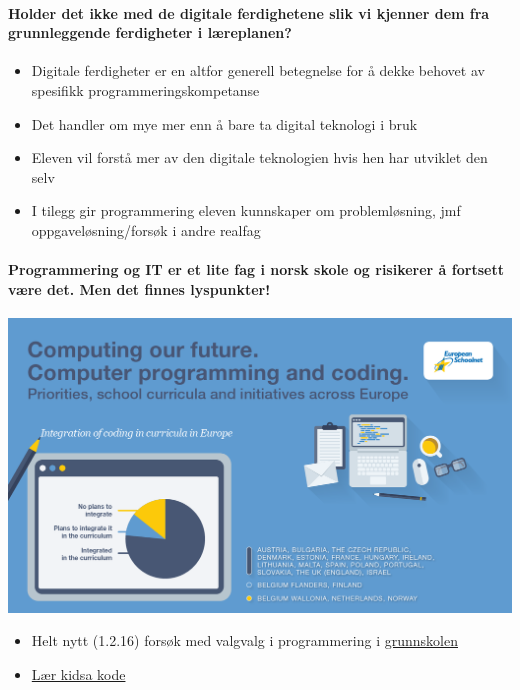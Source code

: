 \documentclass[%
oneside,                 %
final,                   %
10pt,norsk]{article}
\begin{document}
\noindent


\paragraph{Holder det ikke med de digitale ferdighetene slik vi kjenner dem fra grunnleggende ferdigheter i læreplanen?}
\begin{itemize}
\item Digitale ferdigheter er en altfor generell betegnelse for å dekke behovet av spesifikk programmeringskompetanse

\item Det handler om mye mer enn å bare ta digital teknologi i bruk

\item Eleven vil forstå mer av den digitale teknologien hvis hen har utviklet den selv

\item I tilegg gir programmering eleven kunnskaper om problemløsning, jmf oppgaveløsning/forsøk i andre realfag
\end{itemize}

\noindent



\paragraph{Programmering og IT er et lite fag i norsk skole og risikerer å fortsett være det. Men det finnes lyspunkter!}
\centerline{\includegraphics[width=0.9\linewidth]{fig/computing_our_future.png}}



\begin{itemize}
\item Helt nytt (1.2.16) forsøk med valgvalg i programmering i \href{{http://www.udir.no/Lareplaner/Forsok-og-pagaende-arbeid/forsok-med-programmering-som-valgfag}}{grunnskolen}

\item \href{{http://kidsakoder.no}}{Lær kidsa kode}
\end{itemize}
\end{document}
